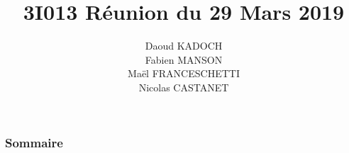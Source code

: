 \documentclass{beamer}
\title{3I013 Réunion du 29 Mars 2019}
\author{Daoud KADOCH\\Fabien MANSON\\Maël FRANCESCHETTI\\Nicolas CASTANET\\}
\begin{document}
	\begin{frame}
		\begin{center}
		\date{}
		\maketitle
		\end{center}
	\end{frame}
	
	
	
	\begin{frame}
		\section{}
		\begin{flushleft}
		\frametitle{Sommaire}
		\tableofcontents{}
		\end{flushleft}
	\end{frame}
	
\end{document}

